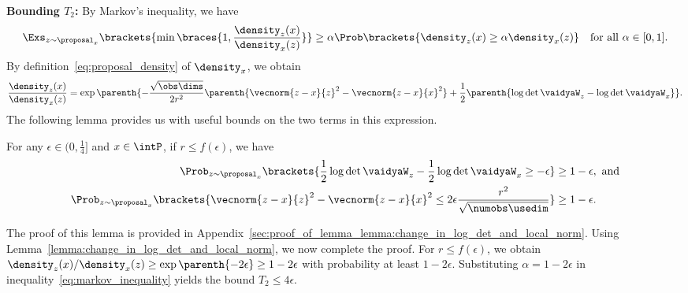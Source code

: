 \noindent \textbf{Bounding $T_2$:}
By Markov's inequality, we have
\begin{align}
	\Exs_{z \sim \proposal_x} \brackets{\min\braces{1, \frac{\density_z(x)}{\density_x(z)}}} \geq \alpha \Prob\brackets{\density_z(x) \geq \alpha \density_x(z)}
	\quad \mbox{for all $\alpha \in [0, 1]$}. \label{eq:markov_inequality}
\end{align}
By definition~\eqref{eq:proposal_density} of $\density_x$, we obtain
\begin{align*}
	\frac{\density_z(x)}{\density_x(z)} = \exp \parenth{-\frac{\sqrt{\obs\dims}}{2r^2} \parenth{\vecnorm{z-x}{z}^2- \vecnorm{z-x}{x}^2 }+ \frac{1}{2} \parenth{\log \det \vaidyaW_z - \log \det \vaidyaW_x}}.
\end{align*}
The following lemma provides us with useful bounds on the two terms in this expression.
 \begin{lemma}
 	\label{lemma:change_in_log_det_and_local_norm}
 	For any $\epsilon \in (0, \frac{1}{4}]$ and $x \in \intP$, if $r \leq f(\epsilon)$, we have
 	\begin{subequations}
 		\begin{align}
 			 \Prob_{z\sim \proposal_x}\brackets{\frac{1}{2}\log\det \vaidyaW_z - \frac{1}{2}\log\det \vaidyaW_x \geq -\epsilon } &\geq 1 - \epsilon,
 			 \ \text{and}\label{eq:whp_log_det_filter}\\
 			 \Prob_{z\sim \proposal_x}\brackets{\vecnorm{z - x}{z}^2 - \vecnorm{z - x}{x}^2 \leq 2 \epsilon \frac{r^2}{\sqrt{\numobs\usedim}} } &\geq 1 - \epsilon \label{eq:whp_local_norm}.
 		\end{align}
 	\end{subequations}
 \end{lemma}
The proof of this lemma is provided in Appendix~\ref{sec:proof_of_lemma_lemma:change_in_log_det_and_local_norm}.
Using Lemma~\ref{lemma:change_in_log_det_and_local_norm}, we now complete the proof.
For $r \leq f(\epsilon)$, we obtain $\density_z(x) /\density_x(z) \geq \exp\parenth{-2\epsilon} \geq 1- 2\epsilon$ with probability at least $1-2\epsilon$.
Substituting $\alpha = 1-2\epsilon$ in inequality~\eqref{eq:markov_inequality} yields the bound $T_2 \leq 4\epsilon$.




